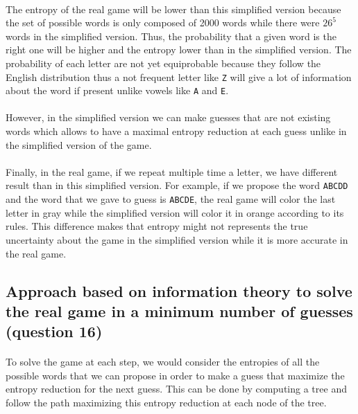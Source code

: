 \documentclass[a4paper, 11pt, oneside]{article}
\begin{document}
\paragraph{}The entropy of the real game will be lower than this simplified version because the set of possible words is only composed of 2000 words while there were $26^5$ words in the simplified version. Thus, the probability that a given word is the right one will be higher and the entropy lower than in the simplified version. 
The probability of each letter are not yet equiprobable because they follow the English distribution thus a not frequent letter like \texttt{Z} will give a lot of information about the word if present unlike vowels like \texttt{A} and \texttt{E}.

\paragraph{}However, in the simplified version we can make guesses that are not existing words which allows to have a maximal entropy reduction at each guess unlike in the simplified version of the game.

\paragraph{}Finally, in the real game, if we repeat multiple time a letter, we have different result than in this simplified version. For example, if we propose the word \texttt{ABCDD} and the word that we gave to guess is \texttt{ABCDE}, the real game will color the last letter in gray while the simplified version will color it in orange according to its rules. This difference makes that entropy might not represents the true uncertainty about the game in the simplified version while it is more accurate in the real game.

\subsection{Approach based on information theory to solve the real game in a minimum number of guesses (question 16)}

\paragraph{}To solve the game at each step, we would consider the entropies of all the possible words that we can propose in order to make a guess that maximize the entropy reduction for the next guess. This can be done by computing a tree and follow the path maximizing this entropy reduction at each node of the tree.

\end{document}
